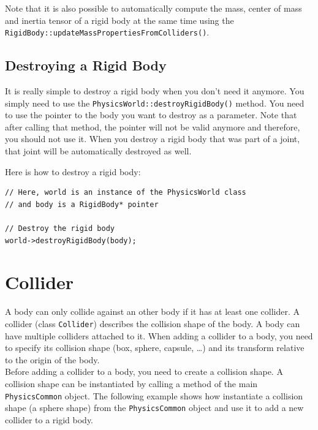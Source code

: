 \documentclass[a4paper,12pt]{article}
\begin{document}
    \vspace{0.6cm}

    \begin{sloppypar}
    Note that it is also possible to automatically compute the mass, center of mass and inertia tensor of a rigid body at the same time using the
    \texttt{RigidBody::updateMassPropertiesFromColliders()}.
    \end{sloppypar}

    \subsection{Destroying a Rigid Body}

    \begin{sloppypar}
    It is really simple to destroy a rigid body when you don't need it anymore. You simply need to use the \texttt{PhysicsWorld::destroyRigidBody()}
    method. You need to use the pointer to the body you want to destroy as a parameter. Note that after calling that method, the pointer will not be valid
    anymore and therefore, you should not use it. When you destroy a rigid body that was part of a joint, that joint will be automatically destroyed as
    well. \\
    \end{sloppypar}

    Here is how to destroy a rigid body: \\

    \begin{lstlisting}
// Here, world is an instance of the PhysicsWorld class
// and body is a RigidBody* pointer

// Destroy the rigid body
world->destroyRigidBody(body);
  \end{lstlisting}

    \section{Collider}
    \label{sec:collider}

    A body can only collide against an other body if it has at least one collider. A collider (class \texttt{Collider}) describes the collision shape
    of the body. A body can have multiple colliders attached to it. When adding a collider to a body, you need to specify its collision
    shape (box, sphere, capsule, \dots) and its transform relative to the origin of the body. \\

    Before adding a collider to a body, you need to create a collision shape. A collision shape can be instantiated by calling a method of the
    main \texttt{PhysicsCommon} object. The following example shows how instantiate a collision shape (a sphere shape) from the \texttt{PhysicsCommon}
    object and use it to add a new collider to a rigid body. \\
\end{document}

